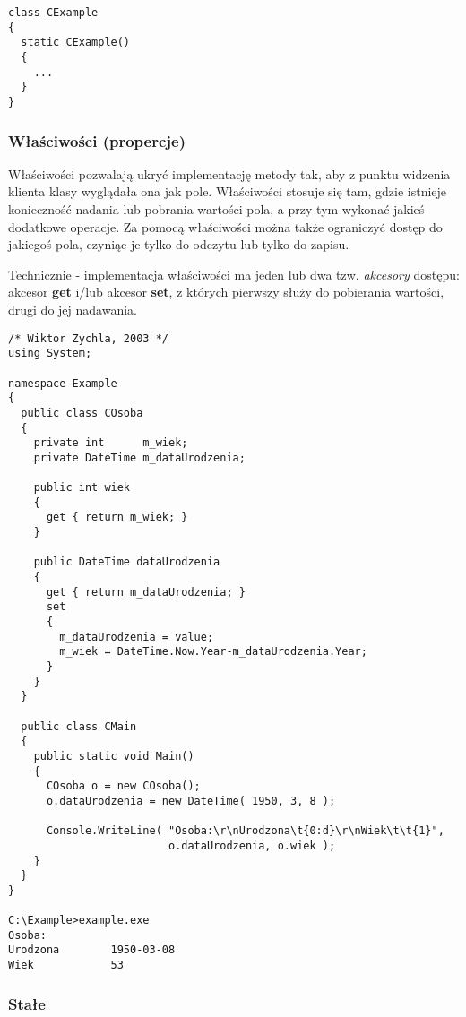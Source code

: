 \begin{scriptsize}
\begin{verbatim}
class CExample
{
  static CExample()
  {
    ...
  }
}
\end{verbatim}
\end{scriptsize}

\subsubsection{Właściwości (propercje)}
\label{properties}

Właściwości pozwalają ukryć implementację metody tak, aby z punktu widzenia klienta klasy 
wyglądała ona jak pole. Właściwości stosuje się tam, gdzie istnieje konieczność nadania
lub pobrania wartości pola, a przy tym wykonać jakieś dodatkowe operacje. Za pomocą właściwości można
także ograniczyć dostęp do jakiegoś pola, czyniąc je tylko do odczytu lub tylko do zapisu.

Technicznie - implementacja właściwości ma jeden lub dwa tzw. {\em akcesory} dostępu: 
akcesor {\bf get} i/lub akcesor {\bf set}, z których pierwszy służy do pobierania wartości, drugi do jej nadawania.

\begin{scriptsize}
\begin{verbatim}
/* Wiktor Zychla, 2003 */
using System;

namespace Example
{
  public class COsoba
  {
    private int      m_wiek;
    private DateTime m_dataUrodzenia;
	
    public int wiek
    {
      get { return m_wiek; }
    }

    public DateTime dataUrodzenia
    {
      get { return m_dataUrodzenia; }
      set 
      {
        m_dataUrodzenia = value;
        m_wiek = DateTime.Now.Year-m_dataUrodzenia.Year;
      }
    }
  }

  public class CMain
  {    
    public static void Main()
    {
      COsoba o = new COsoba();
      o.dataUrodzenia = new DateTime( 1950, 3, 8 );

      Console.WriteLine( "Osoba:\r\nUrodzona\t{0:d}\r\nWiek\t\t{1}", 
                         o.dataUrodzenia, o.wiek );
    }
  }
}

C:\Example>example.exe
Osoba:
Urodzona        1950-03-08
Wiek            53
\end{verbatim}
\end{scriptsize}

\subsubsection{Stałe}

